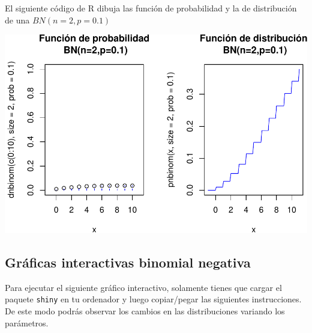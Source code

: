 \documentclass[]{book}
\begin{document}
El siguiente código de R dibuja las función de probabilidad y la de distribución de una \(BN(n=2,p=0.1)\)

\begin{center}\includegraphics{curso-probabilidad-udemy_files/figure-latex/unnamed-chunk-46-1} \end{center}

\hypertarget{gruxe1ficas-interactivas-binomial-negativa}{%
\subsection{Gráficas interactivas binomial negativa}\label{gruxe1ficas-interactivas-binomial-negativa}}

Para ejecutar el siguiente gráfico interactivo, solamente tienes que cargar el paquete \texttt{shiny} en tu ordenador y luego copiar/pegar las siguientes instrucciones. De este modo podrás observar los cambios en las distribuciones variando los parámetros.
\end{document}
